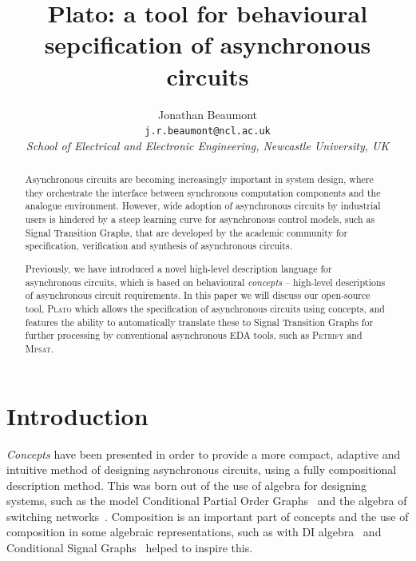 \documentclass[british,conference,compsoc]{IEEEtran}
\newcommand{\noun}[1]{\textsc{#1}}
\begin{document}
\twocolumn

\title{Plato: a tool for behavioural 
\\ sepcification of asynchronous circuits}
\author{Jonathan Beaumont\\
\texttt{j.r.beaumont@ncl.ac.uk}\\
\emph{School of Electrical and Electronic Engineering, Newcastle University,
UK}}

\maketitle

\begin{abstract}
Asynchronous circuits are becoming increasingly important in
system design, where they orchestrate
the interface between synchronous computation components
and the analogue environment.
However, wide adoption of asynchronous circuits by industrial users is
hindered by a steep learning curve for asynchronous control models,
such as Signal Transition Graphs, that are developed by the academic
community for specification, verification and synthesis of
asynchronous circuits.

Previously, we have introduced a novel high-level description language
for asynchronous circuits, which is based on behavioural
\textit{concepts} -- high-level descriptions of asynchronous circuit
requirements.
In this paper we will discuss our open-source tool, \noun{Plato} 
which allows the specification of asynchronous circuits using concepts, and 
features the ability to automatically translate these to Signal Transition 
Graphs for further processing by conventional asynchronous EDA 
tools, such as \noun{Petrify} and \noun{Mpsat}.
\end{abstract}

\sloppy
\thispagestyle{empty}

\vspace{-3mm}

\section{Introduction}

\vspace{-3mm}

\emph{Concepts} have been presented in order to provide a more compact, 
adaptive and intuitive method of designing asynchronous circuits, using a fully
compositional description method. This was born out of the use of algebra for 
designing systems, such as the model Conditional Partial Order
Graphs~\cite{CPOG1}\cite{CPOG2}\cite{2014_mokhov_pg} and
the algebra of switching networks~\cite{mokhov2015algebra}. Composition is an 
important part of concepts and the use of composition in some algebraic 
representations, such as with DI algebra~\cite{270632} and Conditional Signal 
Graphs~\cite{6243877} helped to inspire this. 
\end{document}

